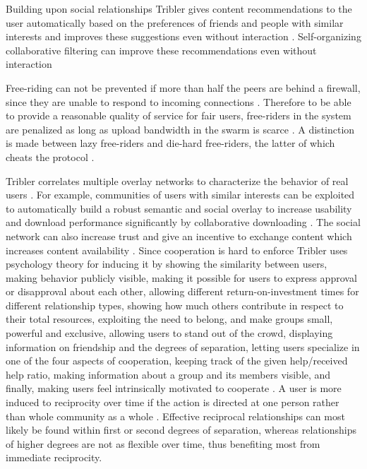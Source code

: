 \documentclass[conference,compsoc]{IEEEtran}
\begin{document}
Building upon social relationships Tribler gives content recommendations to the user automatically based on the preferences of friends and people with similar interests and improves these suggestions even without interaction \cite{beyond2005, ASCI-2008-buddycast}.
Self-organizing collaborative filtering can improve these recommendations even without interaction \cite{Wang:WiFiWalkman, Wang:SelfOrganizing, Wang:Distributed_ASCI, ClementsIR2007, Wang:2008a}

Free-riding can not be prevented if more than half the peers are behind a firewall, since they are unable to respond to incoming connections \cite{JanDavidFFFPaperIEEE2008}.
Therefore to be able to provide a reasonable quality of service for fair users, free-riders in the system are penalized as long as upload bandwidth in the swarm is scarce \cite{mol2008a}.
A distinction is made between lazy free-riders and die-hard free-riders, the latter of which cheats the protocol \cite{bartercast}.

Tribler correlates multiple overlay networks to characterize the behavior of real users \cite{mprobe05gp2pc}.
For example, communities of users with similar interests can be exploited to automatically build a robust semantic and social overlay to increase usability and download performance significantly by collaborative downloading \cite{TriblerOverviewJournal, PawelOffloading}.
The social network can also increase trust and give an incentive to exchange content which increases content availability \cite{Wang:2008a}.
Since cooperation is hard to enforce Tribler uses psychology theory for inducing it by showing the similarity between users, making behavior
publicly visible, making it possible for users to express approval or disapproval
about each other, allowing different return-on-investment times for different relationship
types, showing how much others contribute in respect to their total resources, exploiting the
need to belong, and make groups small, powerful and exclusive, allowing users to stand
out of the crowd, displaying information on friendship and the degrees of separation, letting 
users specialize in one of the four aspects of cooperation, keeping track of the given
help/received help ratio, making information about a group and its members visible, and
finally, making users feel intrinsically motivated to cooperate \cite{FokkerEuroITV2007, fokker2007b}.
A user is more induced to reciprocity over time if the action is directed at one person rather than whole community as a whole \cite{fokker2008a}.
Effective reciprocal relationships can most likely be found within first or second degrees of separation, whereas relationships of higher degrees are not as flexible over time, thus benefiting most from immediate reciprocity. \cite{DelayedReciprocity2008}
\end{document}
